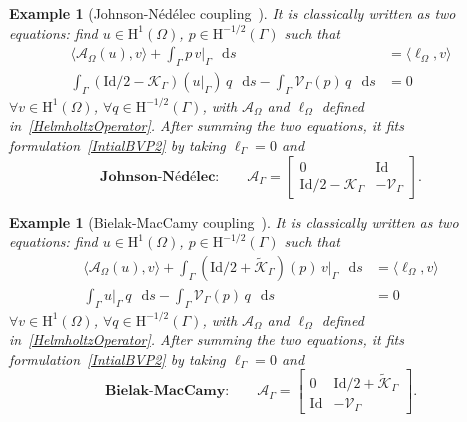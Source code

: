 \documentclass[a4paper,11pt]{article}
\newcommand{\mH}{\mathrm{H}}
\newcommand{\Id}{\mathrm{Id}}
\newcommand{\lbr}{\lbrack}
\newcommand{\rbr}{\rbrack}
\newcommand{\diff}{\mathop{}\!\mathrm{d}}   %
\newtheorem{example}[defn]{Example}
\begin{document}
\begin{example}[Johnson-N\'ed\'elec coupling~\cite{JohnsonNedelec1980CBI,MR3089444,MR2831059}]
  It is classically written as two equations: 
  find $u\in \mH^{1}(\Omega)$, $p\in \mH^{-1/2}(\Gamma)$ such that
  \[
    \begin{aligned}
      \langle \mathcal{A}_{\Omega}(u),v\rangle 
      + \int_{\Gamma} p\,v\vert_{\Gamma} \, \diff s  & = \langle \ell_{\Omega},v\rangle \\
      \int_{\Gamma} (\Id/2-\mathcal{K}_{\Gamma})(u\vert_{\Gamma})\,q \,\diff s
      - \int_{\Gamma} \mathcal{V}_{\Gamma}(p)\,q \,\diff s & = 0
    \end{aligned}
  \]
  $\forall v\in \mH^{1}(\Omega)$, $\forall q\in \mH^{-1/2}(\Gamma)$,  
  with $\mathcal{A}_{\Omega}$ and $\ell_{\Omega}$ defined in~\eqref{HelmholtzOperator}. 
  After summing the two equations, it fits formulation~\eqref{IntialBVP2} by taking $\ell_{\Gamma}=0$ and 
  \begin{equation}\label{JohnsonNedelecCoupling}
    \textbf{Johnson-N\'ed\'elec:} \qquad 
    \mathcal{A}_{\Gamma} =
    \left\lbr\begin{array}{cc}
    0 & \Id\\
    \Id/2-\mathcal{K}_{\Gamma} & -\mathcal{V}_{\Gamma}
    \end{array}\right\rbr. 
  \end{equation}
\end{example}

\begin{example}[Bielak-MacCamy coupling~\cite{MR700668}] 
  It is classically written as two equations: 
  find $u\in \mH^{1}(\Omega)$, $p\in \mH^{-1/2}(\Gamma)$ such that
  \[
    \begin{aligned}
      \langle \mathcal{A}_{\Omega}(u),v\rangle 
      + \int_{\Gamma} (\Id/2+\tilde{\mathcal{K}}_{\Gamma})(p)\,v\vert_{\Gamma} \,\diff s  
      & = \langle \ell_{\Omega},v\rangle \\
      \int_{\Gamma} u\vert_{\Gamma}\,q \,\diff s
      - \int_{\Gamma} \mathcal{V}_{\Gamma}(p)\,q \,\diff s & = 0
    \end{aligned}
  \]
  $\forall v\in \mH^{1}(\Omega)$, $\forall q\in \mH^{-1/2}(\Gamma)$,  
  with $\mathcal{A}_{\Omega}$ and $\ell_{\Omega}$ defined in~\eqref{HelmholtzOperator}. 
  After summing the two equations, it fits formulation~\eqref{IntialBVP2} by taking $\ell_{\Gamma}=0$ and 
  \begin{equation}\label{BielakMacCamyCoupling}
    \textbf{Bielak-MacCamy:} \qquad
    \mathcal{A}_{\Gamma} =
    \left\lbr\begin{array}{cc}
    0   & \Id/2+\tilde{\mathcal{K}}_{\Gamma} \\
    \Id & -\mathcal{V}_{\Gamma}
    \end{array}\right\rbr.
  \end{equation}
\end{example}
\end{document}
